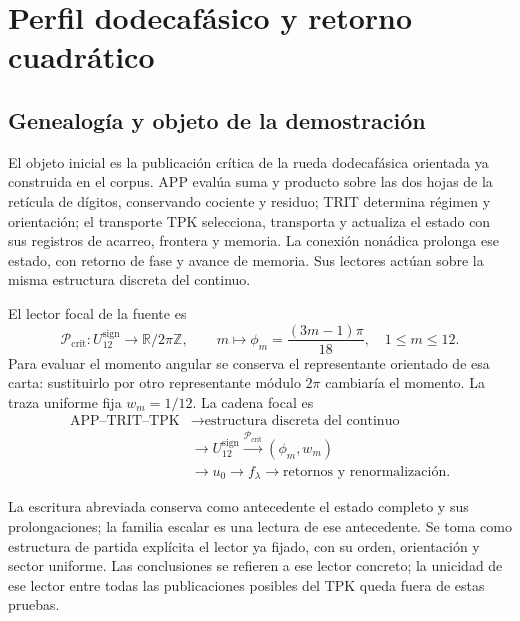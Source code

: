 \section{Perfil dodecafásico y retorno cuadrático}
\label{hmtfg:fragmento:perfil-dodecafasico-y-retorno-cuadratico}

\subsection{Genealogía y objeto de la demostración}
\label{hmtfg:desarrollo:1}

El objeto inicial es la publicación crítica de la rueda dodecafásica orientada ya construida en el corpus. APP evalúa suma y producto sobre las dos hojas de la retícula de dígitos, conservando cociente y residuo; TRIT determina régimen y orientación; el transporte TPK selecciona, transporta y actualiza el estado con sus registros de acarreo, frontera y memoria. La conexión nonádica prolonga ese estado, con retorno de fase y avance de memoria. Sus lectores actúan sobre la misma estructura discreta del continuo.

El lector focal de la fuente es
\[
\mathcal P_{\mathrm{crit}}:U_{12}^{\mathrm{sign}}\longrightarrow
\mathbb R/2\pi\mathbb Z,\qquad
m\longmapsto\phi_m=\frac{(3m-1)\pi}{18},\quad 1\le m\le12.
\]
Para evaluar el momento angular se conserva el representante orientado de esa carta: sustituirlo por otro representante módulo \(2\pi\) cambiaría el momento. La traza uniforme fija \(w_m=1/12\). La cadena focal es
\[\begin{aligned}
\text{APP–TRIT–TPK}&\longrightarrow
\text{estructura discreta del continuo}\\ &\longrightarrow U_{12}^{\mathrm{sign}}
\xrightarrow{\mathcal P_{\mathrm{crit}}}(\phi_m,w_m)
\\ &\longrightarrow u_0\longrightarrow f_\lambda
\longrightarrow\text{retornos y renormalización}.
\end{aligned}\]

La escritura abreviada conserva como antecedente el estado completo y sus prolongaciones; la familia escalar es una lectura de ese antecedente. Se toma como estructura de partida explícita el lector ya fijado, con su orden, orientación y sector uniforme. Las conclusiones se refieren a ese lector concreto; la unicidad de ese lector entre todas las publicaciones posibles del TPK queda fuera de estas pruebas.


